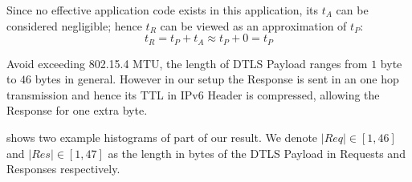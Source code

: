  

Since no effective application code exists in this application, its $t_A$ can be considered negligible; hence $t_R$ can be viewed as an approximation of $t_P$:
\begin{equation}
t_R = t_P + t_A \approx t_P + 0 = t_P
\end{equation}

Avoid exceeding 802.15.4 MTU, the length of DTLS Payload ranges from $1$ byte to $46$ bytes in general. However in our setup the Response is sent in an one hop transmission and hence its TTL in IPv6 Header is compressed, allowing the Response for one extra byte.

 shows two example histograms of part of our result. We denote $|Req| \in [1,46]$ and $|Res| \in [1,47]$ as the length in bytes of the DTLS Payload in Requests and Responses respectively.

